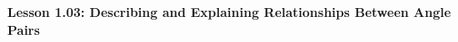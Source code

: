 \begin{center}
\textbf{Lesson 1.03: Describing and Explaining Relationships Between Angle Pairs}
\end{center}

\vspace*{-1.5ex}

